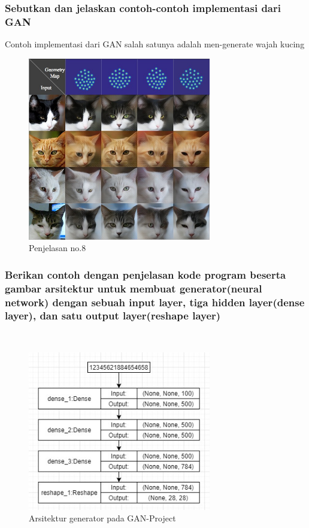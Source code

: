 \subsubsection{Sebutkan dan jelaskan contoh-contoh implementasi dari GAN}
\hfill\break
Contoh implementasi dari GAN salah satunya adalah men-generate wajah kucing
\begin{figure}[H]
	\centering
	\includegraphics[width=8cm]{figures/1174067/8/8.jpg}
	\caption{Penjelasan no.8}
\end{figure}

\subsubsection{Berikan contoh dengan penjelasan kode program beserta gambar arsitektur untuk membuat generator(neural network) dengan sebuah input layer, tiga hidden layer(dense layer), dan satu output layer(reshape layer)}
\hfill\\
\begin{figure}[H]
	\centering
	\includegraphics[width=8cm]{figures/1174067/8/3a.jpg}
	\caption{Arsitektur generator pada GAN-Project}
\end{figure}


